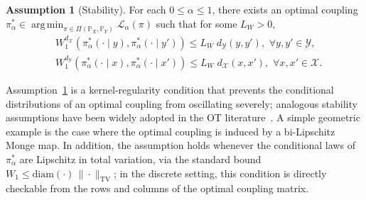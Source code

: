\documentclass{article}
\theoremstyle{plain}
\theoremstyle{definition}
\newtheorem{assumption}[theorem]{Assumption}
\theoremstyle{remark}
\DeclareMathOperator*{\argmin}{arg\,min}
\begin{document}
\begin{assumption}[Stability]
    \label{ass:stability}
    For each $0 \leq \alpha \leq 1$, there exists an optimal coupling $\pi_\alpha^* \in \argmin_{\pi \in \Pi(\mathbb{P}_X,\mathbb{P}_Y)}\mathcal{L}_{\alpha}(\pi)$ such that for some $L_W > 0$,
    \begin{align*}
        &W_1^{d_{\mathcal{X}}}(\pi_\alpha^*(\cdot \mid y), \pi_\alpha^*(\cdot \mid y')) \leq L_W \; d_{\mathcal{Y}}(y,y') , \,\, \forall y,y' \in \mathcal{Y},\\
        &W_1^{d_{\mathcal{Y}}}(\pi_\alpha^*(\cdot \mid x), \pi_\alpha^*(\cdot \mid x')) \leq L_W \; d_{\mathcal{X}}(x,x') , \,\, \forall x,x' \in \mathcal{X}.
    \end{align*}
\end{assumption}
Assumption~\ref{ass:stability} is a kernel-regularity condition that prevents the conditional distributions of an optimal coupling from oscillating severely; analogous stability assumptions have been widely adopted in the OT literature~\citep{deb2021rates,hutter2021minimax,manole2024plugin}. A simple geometric example is the case where the optimal coupling is induced by a bi-Lipschitz Monge map. In addition, the assumption holds whenever the conditional laws of $\pi^*_{\alpha}$ are Lipschitz in total variation, via the standard bound $W_1 \leq \mathrm{diam}(\cdot)\,\|\cdot\|_{\mathrm{TV}}$; in the discrete setting, this condition is directly checkable from the rows and columns of the optimal coupling matrix.
\end{document}
